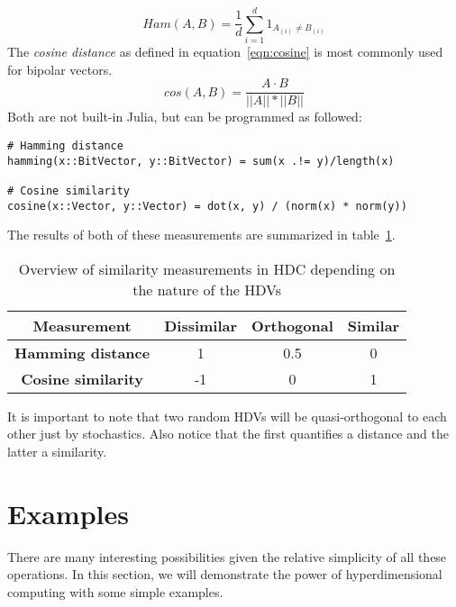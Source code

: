 \begin{equation}
    \label{eqn:Hamming}
    Ham(A, B) = \frac{1}{d} \sum_{i=1}^{d} 1_{A_{(i)} \neq B_{(i)}}
\end{equation}
The \textit{cosine distance} as defined in equation~\ref{eqn:cosine} is most commonly used for bipolar vectors.
\begin{equation}
    \label{eqn:cosine}
    cos(A, B) = \frac{A \cdot B}{||A|| * ||B||}
\end{equation}
Both are not built-in Julia, but can be programmed as followed:
\begin{verbatim}
# Hamming distance
hamming(x::BitVector, y::BitVector) = sum(x .!= y)/length(x)

# Cosine similarity
cosine(x::Vector, y::Vector) = dot(x, y) / (norm(x) * norm(y))
\end{verbatim}
The results of both of these measurements are summarized in table~\ref{tab:dist}.
\begin{table}[h]
    \caption{\label{tab:dist}Overview of similarity measurements in HDC depending on the nature of the HDVs}
    \begin{tabular}{|c||c|c|c|}
        \hline
        \textbf{Measurement} & \textbf{Dissimilar} & \textbf{Orthogonal} & \textbf{Similar} \\
        \hline
        \textbf{Hamming distance} & 1 & 0.5 & 0 \\
        \hline
        \textbf{Cosine similarity} & -1 & 0 & 1 \\
        \hline
    \end{tabular} 
\end{table}

It is important to note that two random HDVs will be quasi-orthogonal to each other just by stochastics. Also notice that the first quantifies a distance and the latter a similarity.
\section{Examples}
There are many interesting possibilities given the relative simplicity of all these operations. In this section, we will demonstrate the power of hyperdimensional computing with some simple examples.
